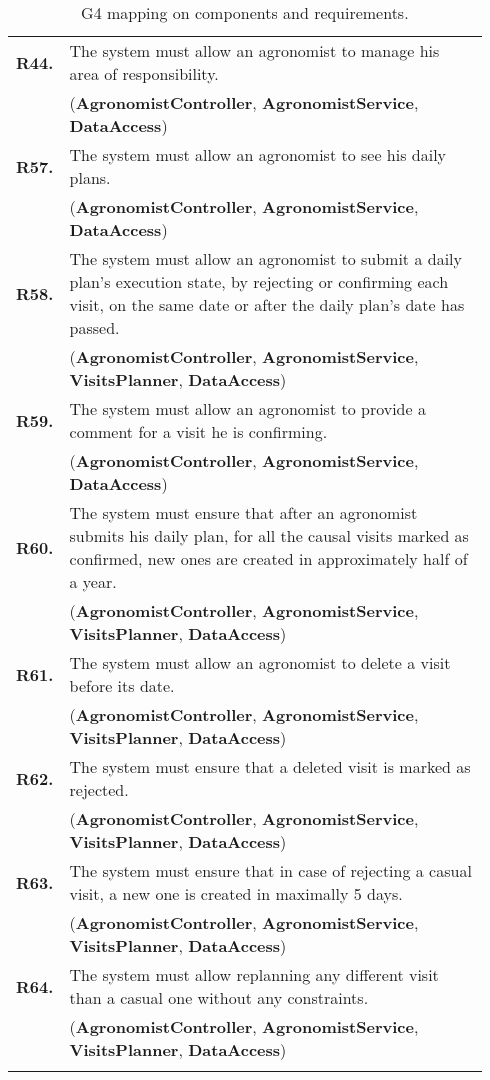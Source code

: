 \begin{longtable}{p{0.06\linewidth} p{0.88\linewidth}}
	\textbf{R44.} & The system must allow an agronomist to manage his area of responsibility.\\
	& (\textbf{AgronomistController}, \textbf{AgronomistService}, \textbf{DataAccess})\\
	\textbf{R57.} & The system must allow an agronomist to see his daily plans.\\
	& (\textbf{AgronomistController}, \textbf{AgronomistService}, \textbf{DataAccess})\\
	\textbf{R58.} & The system must allow an agronomist to submit a daily plan's execution state, by rejecting or confirming each visit, on the same date or after the daily plan's date has passed. \\
	& (\textbf{AgronomistController}, \textbf{AgronomistService}, \textbf{VisitsPlanner}, \textbf{DataAccess})\\
	\textbf{R59.} & The system must allow an agronomist to provide a comment for a visit he is confirming.\\
	& (\textbf{AgronomistController}, \textbf{AgronomistService}, \textbf{DataAccess})\\
	
	\textbf{R60.} & The system must ensure that after an agronomist submits his daily plan, for all the causal visits marked as confirmed, new ones are created in approximately half of a year.\\
	& (\textbf{AgronomistController}, \textbf{AgronomistService}, \textbf{VisitsPlanner}, \textbf{DataAccess})\\
	\textbf{R61.} & The system must allow an agronomist to delete a visit before its date.\\
	& (\textbf{AgronomistController}, \textbf{AgronomistService}, \textbf{VisitsPlanner}, \textbf{DataAccess})\\
	\textbf{R62.} & The system must ensure that a deleted visit is marked as rejected.\\
	& (\textbf{AgronomistController}, \textbf{AgronomistService}, \textbf{VisitsPlanner}, \textbf{DataAccess})\\
	\textbf{R63.} & The system must ensure that in case of rejecting a casual visit, a new one is created in maximally 5 days.\\
	& (\textbf{AgronomistController}, \textbf{AgronomistService}, \textbf{VisitsPlanner}, \textbf{DataAccess})\\
	\textbf{R64.} & The system must allow replanning any different visit than a casual one without any constraints.\\
	& (\textbf{AgronomistController}, \textbf{AgronomistService}, \textbf{VisitsPlanner}, \textbf{DataAccess})\\
    
    \bottomrule
    \caption{G4 mapping on components and requirements.}
\end{longtable}
    

